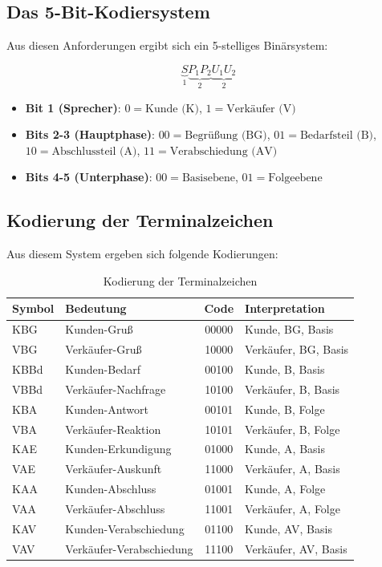 \documentclass[
  12pt,
  a4paper,
  oneside,
  titlepage
]{article}
\begin{document}
\subsection{Das 5-Bit-Kodiersystem}

Aus diesen Anforderungen ergibt sich ein 5-stelliges Binärsystem:

\[
\underbrace{S}_{1} \underbrace{P_1P_2}_{2} \underbrace{U_1U_2}_{2}
\]

\begin{itemize}
    \item \textbf{Bit 1 (Sprecher)}: 
    \(0 = \text{Kunde (K)}\), \(1 = \text{Verkäufer (V)}\)
    
    \item \textbf{Bits 2-3 (Hauptphase)}:
    \(00 = \text{Begrüßung (BG)}\),
    \(01 = \text{Bedarfsteil (B)}\),
    \(10 = \text{Abschlussteil (A)}\),
    \(11 = \text{Verabschiedung (AV)}\)
    
    \item \textbf{Bits 4-5 (Unterphase)}:
    \(00 = \text{Basisebene}\),
    \(01 = \text{Folgeebene}\)
\end{itemize}

\subsection{Kodierung der Terminalzeichen}

Aus diesem System ergeben sich folgende Kodierungen:

\begin{table}[h]
\centering
\caption{Kodierung der Terminalzeichen}
\label{tab:kodierung}
\begin{tabular}{@{} l l c l @{}}
\toprule
\textbf{Symbol} & \textbf{Bedeutung} & \textbf{Code} & \textbf{Interpretation} \\
\midrule
KBG & Kunden-Gruß & 00000 & Kunde, BG, Basis \\
VBG & Verkäufer-Gruß & 10000 & Verkäufer, BG, Basis \\
KBBd & Kunden-Bedarf & 00100 & Kunde, B, Basis \\
VBBd & Verkäufer-Nachfrage & 10100 & Verkäufer, B, Basis \\
KBA & Kunden-Antwort & 00101 & Kunde, B, Folge \\
VBA & Verkäufer-Reaktion & 10101 & Verkäufer, B, Folge \\
KAE & Kunden-Erkundigung & 01000 & Kunde, A, Basis \\
VAE & Verkäufer-Auskunft & 11000 & Verkäufer, A, Basis \\
KAA & Kunden-Abschluss & 01001 & Kunde, A, Folge \\
VAA & Verkäufer-Abschluss & 11001 & Verkäufer, A, Folge \\
KAV & Kunden-Verabschiedung & 01100 & Kunde, AV, Basis \\
VAV & Verkäufer-Verabschiedung & 11100 & Verkäufer, AV, Basis \\
\bottomrule
\end{tabular}
\end{table}
\end{document}
